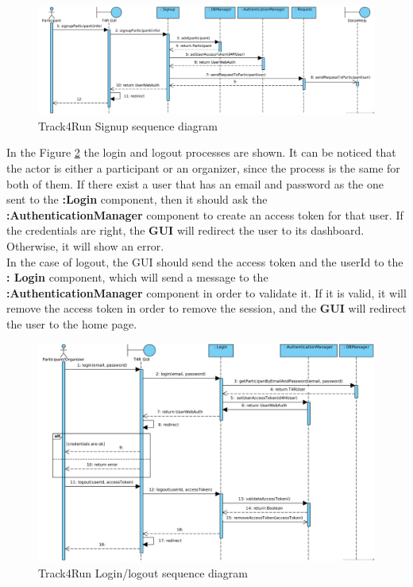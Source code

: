 \documentclass[a4paper, hidelinks, 12pt]{report}
\begin{document}
\begin{itemize}
	\begin{figure}[H]
		\centering
		\includegraphics[width=1\textwidth]{diagrams/sequence_diagrams/t4r_signup_participant.png}
		\caption[Track4Run Signup sequence diagram]{Track4Run Signup sequence diagram}
		\label{fig:t4r_seq_signup}
	\end{figure}
	
	In the Figure \ref{fig:t4r_seq_login} the login and logout processes are shown. It can be noticed that the actor is either a participant or an organizer, since the process is the same for both of them. If there exist a user that has an email and password as the one sent to the \textbf{:Login} component, then it should ask the \textbf{:AuthenticationManager} component to create an access token for that user. If the credentials are right, the \textbf{GUI} will redirect the user to its dashboard. Otherwise, it will show an error.\\
	
	In the case of logout, the GUI should send the access token and the userId to the \textbf{: Login} component, which will send a message to the \textbf{:AuthenticationManager} component in order to validate it. If it is valid, it will remove the access token in order to remove the session, and the \textbf{GUI} will redirect the user to the home page.\\ 
	
	\begin{figure}[H]
		\centering
		\includegraphics[width=1\textwidth]{diagrams/sequence_diagrams/t4r_login_logout.png}
		\caption[Track4Run Login/logout sequence diagram]{Track4Run Login/logout sequence diagram}
		\label{fig:t4r_seq_login}
	\end{figure}
	

\end{itemize}
\end{document}

